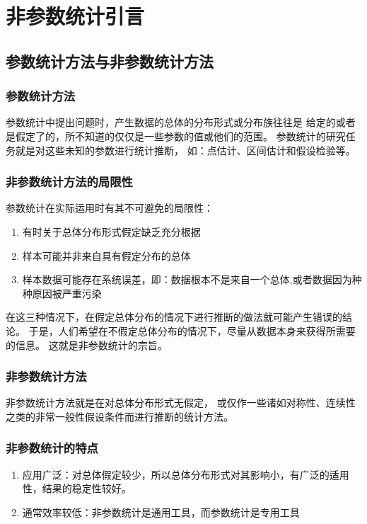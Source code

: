 \documentclass[UTF8]{ctexart}
\numberwithin{equation}{section}
\begin{document}
\clearpage
\section{非参数统计引言}

\subsection{参数统计方法与非参数统计方法}
\subsubsection{参数统计方法}
参数统计中提出问题时，产生数据的总体的分布形式或分布族往往是
给定的或者是假定了的，所不知道的仅仅是一些参数的值或他们的范围。
参数统计的研究任务就是对这些未知的参数进行统计推断，
如：点估计、区间估计和假设检验等。

\subsubsection{非参数统计方法的局限性}
参数统计在实际运用时有其不可避免的局限性：
\begin{enumerate}
    \item 有时关于总体分布形式假定缺乏充分根据
    \item 样本可能并非来自具有假定分布的总体
    \item 样本数据可能存在系统误差，即：数据根本不是来自一个总体,或者数据因为种种原因被严重污染
\end{enumerate}

在这三种情况下，在假定总体分布的情况下进行推断的做法就可能产生错误的结论。
于是，人们希望在不假定总体分布的情况下，尽量从数据本身来获得所需要的信息。
这就是非参数统计的宗旨。 

\subsubsection{非参数统计方法}
非参数统计方法就是在对总体分布形式无假定，
或仅作一些诸如对称性、连续性之类的非常一般性假设条件而进行推断的统计方法。

\subsubsection{非参数统计的特点}
\begin{enumerate}
    \item 应用广泛：对总体假定较少，所以总体分布形式对其影响小，有广泛的适用性，结果的稳定性较好。
    \item 通常效率较低：非参数统计是通用工具，而参数统计是专用工具
\end{enumerate}
\end{document}
